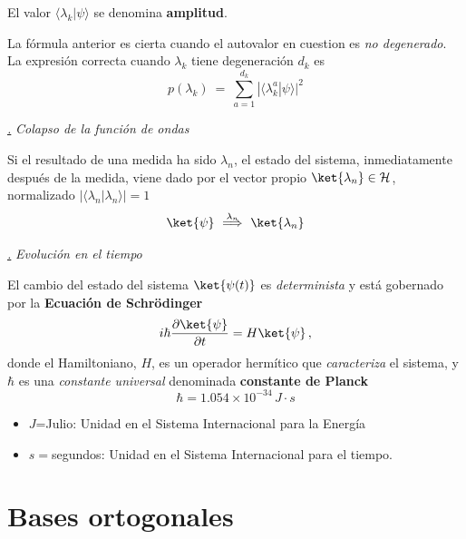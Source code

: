 \documentclass[a4paper,11pt]{book} %
\numberwithin{equation}{chapter}
\newcommand{\braket}[2]{\langle #1|#2\rangle}
\def\subsubiContadorIt{\par\addtocounter{subsubsection}{1}\underline{\it\thesubsubsection.}\hskip0.5cm \setcounter{subsubsubsectionIt}{0}}
\newcommand{\SubsubiIt}[1]{
		\subsubiContadorIt \textit{#1}
	}
\newcounter{subsubsubsectionIt}[subsubsection]
\begin{document}
El valor $\braket{\lambda_k}{\psi}$ se denomina \textbf{amplitud}.

La fórmula anterior es cierta cuando el autovalor en cuestion es \textit{no degenerado}. La expresión correcta cuando $\lambda_k$ tiene degeneración $d_k$ es
	\begin{equation} \label{ec_fundamentos_p_para_lambda_degenerado}
	\boxed{p(\lambda_k)~ = ~ \sum_{a=1}^{d_k}|\braket{\lambda^a_k}{\psi}|^2}
	\end{equation}   

		\SubsubiIt{Colapso de la función de ondas}

\begin{mybox_gray2}{}
 Si el resultado de una medida  ha sido  $\lambda_n$, el estado del sistema, inmediatamente después de la medida, viene dado por el vector propio  $\ket{\lambda_n} \in \mathcal{H}$, normalizado $|\braket{\lambda_n}{\lambda_n}|=1$
	\begin{equation}
	\ket{\psi}~\stackrel{\lambda_n}{\Longrightarrow}~ \ket{\lambda_n} 
	\end{equation}
\end{mybox_gray2}

		\SubsubiIt{Evolución en el tiempo}

\begin{mybox_gray2}{}
El cambio  del estado del sistema $\ket{\psi(t)}$ es \textit{determinista} y 
está gobernado por la \textbf{Ecuación de Schrödinger}
	\begin{equation} \label{ec_fundamentos_ec_de_schrodinger}
	i\hbar \frac{\partial\ket{\psi}}{\partial t} = H \ket{\psi} \, ,
	\end{equation}
donde el Hamiltoniano, $H$, es un operador hermítico que \textit{caracteriza} el sistema, y $\hbar$ es una \textit{constante universal} denominada \textbf{constante de Planck}
	\begin{equation}
	\hbar = 1.054 \times 10^{-34} \, J \cdot s
	\end{equation}
\end{mybox_gray2}

\begin{itemize}
	\item $J$=Julio: Unidad en el Sistema Internacional para la Energía
	\item $s=$segundos: Unidad en el Sistema Internacional para el tiempo. 
\end{itemize}
		


	\section{Bases ortogonales}
		
\end{document}
